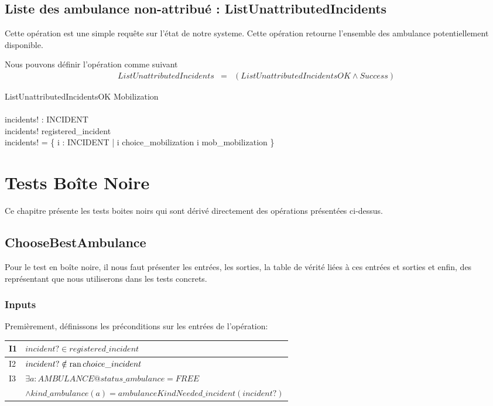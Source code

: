 \documentclass{report}
\begin{document}
\section{Liste des ambulance non-attribué : ListUnattributedIncidents}
Cette opération est une simple requête sur l'état de notre systeme. Cette
opération retourne l'ensemble des ambulance potentiellement disponible.

Nous pouvons définir l'opération comme suivant
\begin{eqnarray*}
ListUnattributedIncidents & = & (ListUnattributedIncidentsOK \land Success)
\end{eqnarray*}

\begin{schema}{ListUnattributedIncidentsOK}
	\Xi Mobilization		\\
	\newline				\\
	incidents! : \power INCIDENT \\
  \where
	incidents! \subseteq registered\_incident \\
	incidents! = \{ i : INCIDENT | i \notin \ran choice\_mobilization \land i \notin \ran mob\_mobilization \}
\end{schema}

\chapter{Tests Boîte Noire}

Ce chapitre présente les tests boites noirs qui sont dérivé directement
des opérations présentées ci-dessus.

\section{ChooseBestAmbulance}

Pour le test en boîte noire, il nous faut présenter les entrées,
les sorties, la table de vérité liées à ces entrées et sorties et enfin, 
des représentant que nous utiliserons dans les tests concrets.

\subsection{Inputs}

Premièrement, définissons les préconditions sur les entrées de l'opération:

\noindent\begin{minipage}{\marginparsep+\marginparwidth+\marginparpush+\textwidth}
\begin{tabularx}{\textwidth}{|l|X|}
	\hline
	I1 & $incident? \in registered\_incident$ \\
	\hline
	I2 & $incident? \notin \mathop{\mathrm{ran}} choice\_incident$ \\
	\hline
	I3 & $\exists a: AMBULANCE @ status\_ambulance = FREE$\\&$ \land
  	 kind\_ambulance(a) = ambulanceKindNeeded\_incident(incident?)$ \\
	\hline
\end{tabularx}
\end{minipage}
\end{document}

